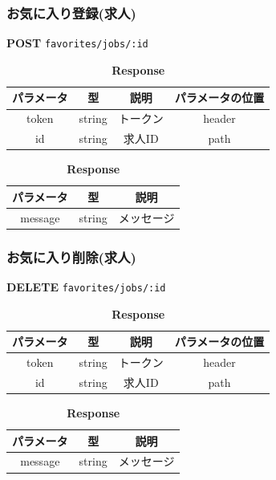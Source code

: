 \subsubsection*{お気に入り登録(求人)}
\textbf{POST} \texttt{favorites/jobs/:id}
\begin{table}[H]
  \begin{minipage}
    {0.5\hsize}
    \centering
    \captionsetup{labelformat=empty,labelsep=none}
    \caption{\textbf{Request}}
    \small
    \begin{tabular}{|c|c|c|c|} \hline
      パラメータ & 型      & 説明   & パラメータの位置 \\ \hline \hline
      token & string & トークン & header   \\ \hline
      id    & string & 求人ID & path     \\ \hline
    \end{tabular}
  \end{minipage}
  \begin{minipage}
    {0.5\hsize}
    \centering
    \captionsetup{labelformat=empty,labelsep=none}
    \caption{\textbf{Response}}
    \begin{tabular}{|c|c|c|} \hline
      パラメータ   & 型      & 説明    \\ \hline \hline
      message & string & メッセージ \\ \hline
    \end{tabular}
  \end{minipage}
\end{table}

\subsubsection*{お気に入り削除(求人)}
\textbf{DELETE} \texttt{favorites/jobs/:id}
\begin{table}[H]
  \begin{minipage}
    {0.5\hsize}
    \centering
    \captionsetup{labelformat=empty,labelsep=none} \caption{\textbf{Request}}
    \small
    \begin{tabular}{|c|c|c|c|} \hline
      パラメータ & 型      & 説明   & パラメータの位置 \\ \hline \hline
      token & string & トークン & header   \\ \hline
      id    & string & 求人ID & path     \\ \hline
    \end{tabular}
  \end{minipage}
  \begin{minipage}
    {0.5\hsize}
    \centering
    \captionsetup{labelformat=empty,labelsep=none} \caption{\textbf{Response}}
    \begin{tabular}{|c|c|c|} \hline
      パラメータ   & 型      & 説明    \\ \hline \hline
      message & string & メッセージ \\ \hline
    \end{tabular}
  \end{minipage}
\end{table}

